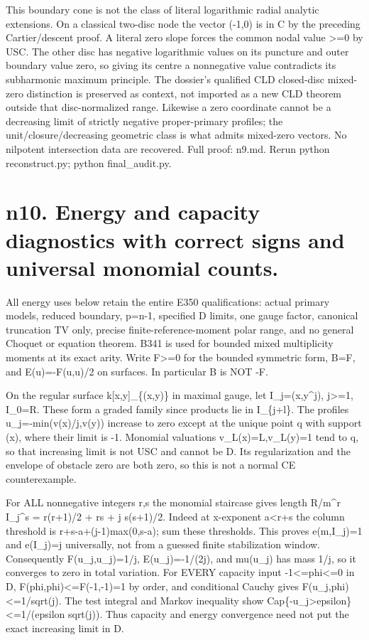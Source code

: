 \documentclass[11pt]{article}
\begin{document}
This boundary cone is not the class of literal logarithmic radial analytic extensions. On a classical two-disc node the vector (-1,0) is in C by the preceding Cartier/descent proof. A literal zero slope forces the common nodal value >=0 by USC. The other disc has negative logarithmic values on its puncture and outer boundary value zero, so giving its centre a nonnegative value contradicts its subharmonic maximum principle. The dossier's qualified CLD closed-disc mixed-zero distinction is preserved as context, not imported as a new CLD theorem outside that disc-normalized range. Likewise a zero coordinate cannot be a decreasing limit of strictly negative proper-primary profiles; the unit/closure/decreasing geometric class is what admits mixed-zero vectors. No nilpotent intersection data are recovered. Full proof: n9.md. Rerun python reconstruct.py; python final\_audit.py.

\section*{n10. Energy and capacity diagnostics with correct signs and universal monomial counts.}
All energy uses below retain the entire E350 qualifications: actual primary models, reduced boundary, p=n-1, specified D limits, one gauge factor, canonical truncation TV only, precise finite-reference-moment polar range, and no general Choquet or equation theorem. B341 is used for bounded mixed multiplicity moments at its exact arity. Write F>=0 for the bounded symmetric form, B=F, and E(u)=-F(u,u)/2 on surfaces. In particular B is NOT -F.

On the regular surface k[x,y]\_\{(x,y)\} in maximal gauge, let I\_j=(x,y\textasciicircum{}j), j>=1, I\_0=R. These form a graded family since products lie in I\_\{j+l\}. The profiles u\_j=-min(v(x)/j,v(y)) increase to zero except at the unique point q with support (x), where their limit is -1. Monomial valuations v\_L(x)=L,v\_L(y)=1 tend to q, so that increasing limit is not USC and cannot be D. Its regularization and the envelope of obstacle zero are both zero, so this is not a normal CE counterexample.

For ALL nonnegative integers r,s the monomial staircase gives
 length R/m\textasciicircum{}r I\_j\textasciicircum{}s = r(r+1)/2 + rs + j s(s+1)/2.
Indeed at x-exponent a<r+s the column threshold is r+s-a+(j-1)max(0,s-a); sum these thresholds. This proves e(m,I\_j)=1 and e(I\_j)=j universally, not from a guessed finite stabilization window. Consequently F(u\_j,u\_j)=1/j, E(u\_j)=-1/(2j), and mu(u\_j) has mass 1/j, so it converges to zero in total variation. For EVERY capacity input -1<=phi<=0 in D, F(phi,phi)<=F(-1,-1)=1 by order, and conditional Cauchy gives F(u\_j,phi)<=1/sqrt(j). The test integral and Markov inequality show Cap\{-u\_j>epsilon\}<=1/(epsilon sqrt(j)). Thus capacity and energy convergence need not put the exact increasing limit in D.
\end{document}
